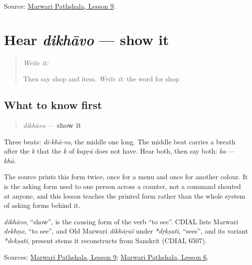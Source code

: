 \begin{tcolorbox}[breakable,colback=teal!4,colframe=teal!35!black,title={Before you move on}]
Source: \href{https://www.marwaripathshala.com/marwari-lesson-9-english}{Marwari Pathshala, Lesson 9}.
\end{tcolorbox}
\section[dikhāvo]{Hear \emph{dikhāvo} — show it}

\label{lesson:MW-C21-hear-dikhavo}



\begin{quote}
\emph{Write it:} \textbf{}

Then say shop and item. \emph{Write it:} the word for shop
\end{quote}

\subsection*{What to know first}
\begin{quote}
\emph{dikhāvo} — \textbf{show it}
\end{quote}

Three beats: \emph{di-khā-vo}, the middle one long. The middle beat carries a breath after the \emph{k} that the \emph{k} of \emph{kapṛā} does not have. Hear both, then say both: \emph{ka} — \emph{khā}.

The source prints this form twice, once for a menu and once for another colour. It is the asking form used to one person across a counter, not a command shouted at anyone, and this lesson teaches the printed form rather than the whole system of asking forms behind it.

\begin{cousinweb}
\emph{dikhāvo}, \textquotedblleft{}show\textquotedblright{}, is the causing form of the verb \textquotedblleft{}to see\textquotedblright{}. CDIAL lists Marwari \emph{dekhṇo}, \textquotedblleft{}to see\textquotedblright{}, and Old Marwari \emph{dikhāṛaï} under \emph{*dṛkṣati}, \textquotedblleft{}sees\textquotedblright{}, and its variant \emph{*dekṣati}, present stems it reconstructs from Sanskrit (CDIAL 6507).
\end{cousinweb}

\begin{tcolorbox}[breakable,colback=teal!4,colframe=teal!35!black,title={Before you move on}]
Sources: \href{https://www.marwaripathshala.com/marwari-lesson-9-english}{Marwari Pathshala, Lesson 9}; \href{https://www.marwaripathshala.com/marwari-lesson-6-english}{Marwari Pathshala, Lesson 6}.
\end{tcolorbox}
